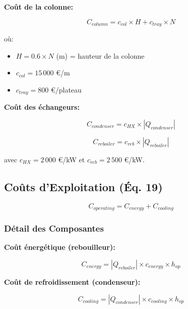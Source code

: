 \documentclass[11pt,a4paper]{article}
\begin{document}
\textbf{Coût de la colonne:}

\begin{equation}
C_{column} = c_{col} \times H + c_{tray} \times N
\end{equation}

où:
\begin{itemize}[leftmargin=*]
    \item $H = 0.6 \times N$ (m) = hauteur de la colonne
    \item $c_{col} = 15\,000$ €/m
    \item $c_{tray} = 800$ €/plateau
\end{itemize}

\textbf{Coût des échangeurs:}

\begin{equation}
C_{condenser} = c_{HX} \times |Q_{condenser}|
\end{equation}

\begin{equation}
C_{reboiler} = c_{reb} \times |Q_{reboiler}|
\end{equation}

avec $c_{HX} = 2\,000$ €/kW et $c_{reb} = 2\,500$ €/kW.

\subsection{Coûts d'Exploitation (Éq. 19)}

\begin{tcolorbox}[colback=yellow!10,colframe=orange!50!black,title=Équation 19: Coût Opératoire]
\begin{equation}
C_{operating} = C_{energy} + C_{cooling}
\end{equation}
\end{tcolorbox}

\subsubsection{Détail des Composantes}

\textbf{Coût énergétique (rebouilleur):}

\begin{equation}
C_{energy} = |Q_{reboiler}| \times c_{energy} \times h_{op}
\end{equation}

\textbf{Coût de refroidissement (condenseur):}

\begin{equation}
C_{cooling} = |Q_{condenser}| \times c_{cooling} \times h_{op}
\end{equation}
\end{document}
